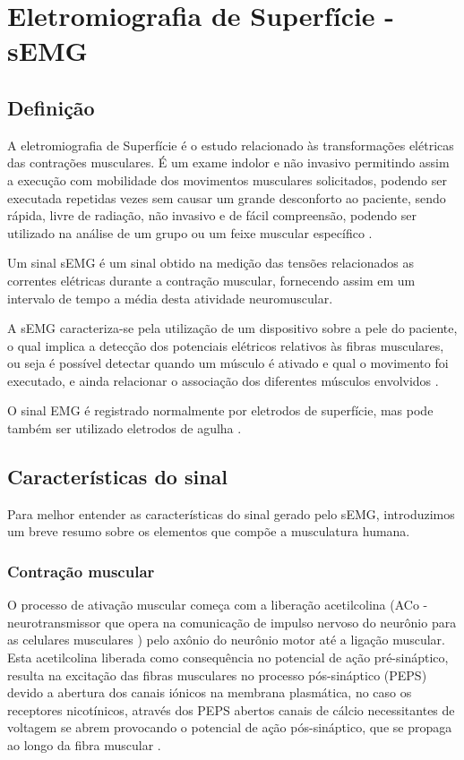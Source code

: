 \chapter{Eletromiografia de Superfície - sEMG}
\section{Definição}
A eletromiografia de Superfície é o estudo relacionado às transformações elétricas das contrações musculares. É um exame indolor e não invasivo permitindo assim a execução com mobilidade dos movimentos musculares solicitados, podendo ser executada repetidas vezes sem causar um grande desconforto ao paciente, sendo rápida, livre de radiação, não invasivo e de fácil compreensão, podendo ser utilizado na análise de um grupo ou um feixe muscular específico \cite{de2010eletromiografia}.

Um sinal sEMG é um sinal obtido na medição das tensões relacionados as correntes elétricas durante a contração muscular, fornecendo assim em um intervalo de tempo a média desta atividade neuromuscular\cite{reaz2006techniques}.

A sEMG caracteriza-se pela utilização de um dispositivo sobre a pele do paciente, o qual implica a detecção dos potenciais elétricos relativos às fibras musculares, ou seja é possível detectar quando um músculo é ativado e qual o movimento foi executado, e ainda relacionar o associação dos diferentes músculos envolvidos \cite{botelho2010avaliaccao}.

O sinal EMG é registrado normalmente por eletrodos de superfície, mas pode também ser utilizado eletrodos de agulha \cite{eftaxias2015detection}.

\section{Características do sinal}
Para melhor entender as características do sinal gerado pelo sEMG, introduzimos um breve resumo sobre os elementos que compõe a musculatura humana.

\subsection{Contração muscular}
O processo de ativação muscular começa com a liberação acetilcolina (ACo - neurotransmissor que opera na comunicação de impulso nervoso do neurônio para as celulares musculares \cite{flores2005estructura}) pelo axônio do neurônio motor até a ligação muscular. Esta acetilcolina liberada como consequência no potencial de ação pré-sináptico, resulta na excitação das fibras musculares no processo pós-sináptico (PEPS) devido a abertura dos canais iónicos na membrana plasmática, no caso os receptores nicotínicos, através dos PEPS abertos canais de cálcio necessitantes de voltagem se abrem provocando o potencial de ação pós-sináptico, que se propaga ao longo da fibra muscular \cite{da2005detecccao}.

